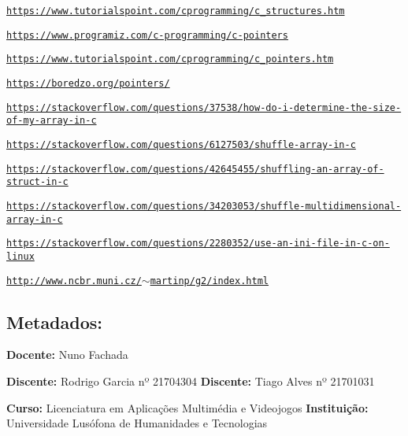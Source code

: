 \begin{DoxyItemize}
\item \href{https://www.tutorialspoint.com/cprogramming/c_structures.htm}{\tt https\+://www.\+tutorialspoint.\+com/cprogramming/c\+\_\+structures.\+htm}
\item \href{https://www.programiz.com/c-programming/c-pointers}{\tt https\+://www.\+programiz.\+com/c-\/programming/c-\/pointers}
\item \href{https://www.tutorialspoint.com/cprogramming/c_pointers.htm}{\tt https\+://www.\+tutorialspoint.\+com/cprogramming/c\+\_\+pointers.\+htm}
\item \href{https://boredzo.org/pointers/}{\tt https\+://boredzo.\+org/pointers/}
\item \href{https://stackoverflow.com/questions/37538/how-do-i-determine-the-size-of-my-array-in-c}{\tt https\+://stackoverflow.\+com/questions/37538/how-\/do-\/i-\/determine-\/the-\/size-\/of-\/my-\/array-\/in-\/c}
\item \href{https://stackoverflow.com/questions/6127503/shuffle-array-in-c}{\tt https\+://stackoverflow.\+com/questions/6127503/shuffle-\/array-\/in-\/c}
\item \href{https://stackoverflow.com/questions/42645455/shuffling-an-array-of-struct-in-c}{\tt https\+://stackoverflow.\+com/questions/42645455/shuffling-\/an-\/array-\/of-\/struct-\/in-\/c}
\item \href{https://stackoverflow.com/questions/34203053/shuffle-multidimensional-array-in-c}{\tt https\+://stackoverflow.\+com/questions/34203053/shuffle-\/multidimensional-\/array-\/in-\/c}
\item \href{https://stackoverflow.com/questions/2280352/use-an-ini-file-in-c-on-linux}{\tt https\+://stackoverflow.\+com/questions/2280352/use-\/an-\/ini-\/file-\/in-\/c-\/on-\/linux}
\item \href{http://www.ncbr.muni.cz/~martinp/g2/index.html}{\tt http\+://www.\+ncbr.\+muni.\+cz/$\sim$martinp/g2/index.\+html}
\end{DoxyItemize}

\subsection*{Metadados\+:}

{\bfseries Docente\+:} Nuno Fachada

{\bfseries Discente\+:} Rodrigo Garcia nº 21704304 {\bfseries Discente\+:} Tiago Alves nº 21701031

{\bfseries Curso\+:} Licenciatura em Aplicações Multimédia e Videojogos {\bfseries Instituição\+:} Universidade Lusófona de Humanidades e Tecnologias 